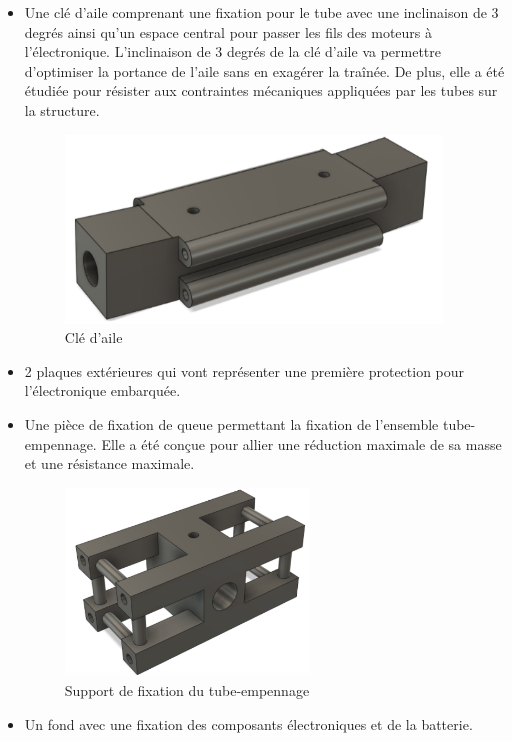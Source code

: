 \documentclass[a4paper,12pt,french]{report}
\begin{document}
\begin{itemize}
    \item Une clé d’aile comprenant une fixation pour le tube avec une inclinaison de 3 degrés ainsi qu’un espace central pour  passer les fils des moteurs à l'électronique. L'inclinaison de 3 degrés de la clé d'aile va permettre d’optimiser la portance de l’aile sans en exagérer la traînée. De plus, elle a été étudiée pour résister aux contraintes mécaniques appliquées par les tubes sur la structure.
          \begin{figure}[h]
              \centering
              \includegraphics[height=5cm]{figures/cle.png}
              \caption{Clé d'aile}
              \label{clé}
          \end{figure}
          \newpage
    \item 2 plaques extérieures qui vont représenter une première protection pour l’électronique embarquée.
    \item Une pièce de fixation de queue permettant la fixation de l’ensemble tube-empennage. Elle a été conçue pour allier une réduction maximale de sa masse et une résistance maximale.
          \begin{figure}[h]
              \centering
              \includegraphics[height=5cm]{figures/arr.png}
              \caption{Support de fixation du tube-empennage}
          \end{figure}
    \item Un fond avec une fixation des composants électroniques et de la batterie.
\end{itemize}
\end{document}
